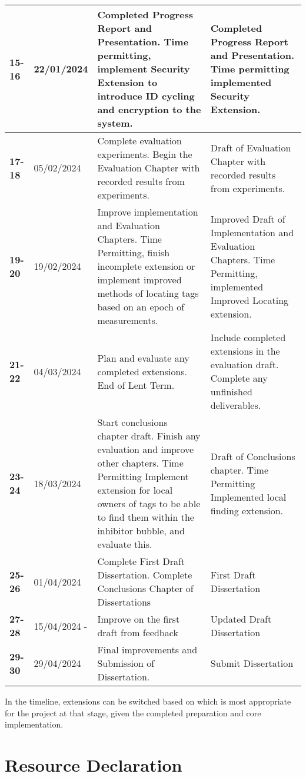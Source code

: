 \documentclass{article}
\begin{document}
\begin{table}[!ht]
\begin{tabular}{|l|l|p{7cm}|p{7cm}|}
\textbf{15-16} & 22/01/2024 & Completed Progress Report and Presentation. Time permitting, implement Security Extension to introduce ID cycling and encryption to the system. & Completed Progress Report and Presentation. Time permitting implemented Security Extension. \\ \hline
\textbf{17-18} & 05/02/2024 & Complete evaluation experiments. Begin the Evaluation Chapter with recorded results from experiments. & Draft of Evaluation Chapter with recorded results from experiments. \\ \hline
\textbf{19-20} & 19/02/2024 & Improve implementation and Evaluation Chapters. Time Permitting, finish incomplete extension or implement improved methods of locating tags based on an epoch of measurements. & Improved Draft of Implementation and Evaluation Chapters. Time Permitting, implemented Improved Locating extension. \\ \hline
\textbf{21-22} & 04/03/2024 & Plan and evaluate any completed extensions. End of Lent Term. & Include completed extensions in the evaluation draft. Complete any unfinished deliverables. \\ \hline
\textbf{23-24} & 18/03/2024 & Start conclusions chapter draft. Finish any evaluation and improve other chapters. Time Permitting Implement extension for local owners of tags to be able to find them within the inhibitor bubble, and evaluate this. & Draft of Conclusions chapter. Time Permitting Implemented local finding extension. \\ \hline
\textbf{25-26} & 01/04/2024 & Complete First Draft Dissertation. Complete Conclusions Chapter of Dissertations & First Draft Dissertation \\ \hline
\textbf{27-28} & 15/04/2024 - & Improve on the first draft from feedback & Updated Draft Dissertation \\ \hline
\textbf{29-30} & 29/04/2024 & Final improvements and Submission of Dissertation. & Submit Dissertation \\ \hline
\end{tabular}
\end{table}

In the timeline, extensions can be switched based on which is most appropriate for the project at that stage, given the completed preparation and core implementation.


\section{Resource Declaration}
\end{document}
